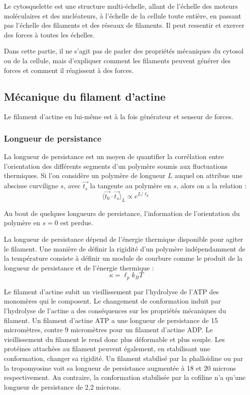 Le cytosquelette est une structure multi-échelle, allant de l'échelle des moteurs moléculaires et des nucléateurs, à l'échelle de la cellule toute entière, en passant pas l'échelle des filaments et des réseaux de filaments. Il peut ressentir et exercer des forces à toutes les échelles. 


Dans cette partie, il ne s'agit pas de parler des propriétés mécaniques du cytosol ou de la cellule, mais d'expliquer comment les filaments peuvent générer des forces et comment il réagissent à des forces. 

\subsection{Mécanique du filament d'actine}

Le filament d'actine en lui-même est à la fois générateur et senseur de forces. 

 \subsubsection{Longueur de persistance}
La longueur de persistance est un moyen de quantifier la corrélation entre l'orientation des différents segments d'un polymère soumis aux fluctuations thermiques. Si l'on considère un polymère de longueur $L$ auquel on attribue une abscisse curviligne $s$, avec $\vec{t_s}$ la tangente au polymère en $s$, alors on a la relation : 
$$ \langle \vec{t_0}\cdot \vec{t_s} \rangle_L \propto e^{L/\ell_p}$$

Au bout de quelques longueurs de persistance, l'information de l'orientation du polymère en $s=0$ est perdue. 

La longueur de persistance dépend de l'énergie thermique disponible pour agiter le filament. Une manière de définir la rigidité d'un polymère indépendamment de la température consiste à définir un module de courbure comme le produit de la longueur de persistance et de l'énergie thermique : $$\kappa = \ell_p k_B T$$


Le filament d'actine subit un vieillissement par l'hydrolyse de l'ATP des monomères qui le composent. Le changement de conformation induit par l'hydrolyse de l'actine a des conséquences sur les propriétés mécaniques du filament. 
Un filament d'actine ATP a une longueur de persistance de 15 micromètres, contre 9 micromètres pour un filament d'actine ADP. Le vieillissement du filament le rend donc plus déformable et plus souple. 
Les protéines attachées au filament peuvent également, en stabilisant une conformation, changer sa rigidité. Un filament stabilisé par la phalloïdine ou par la tropomyosine voit sa longueur de persistance augmentée à 18 et 20 microns respectivement. Au contraire, la conformation stabilisée par la cofiline n'a qu'une longueur de persistance de 2,2 microns. 

